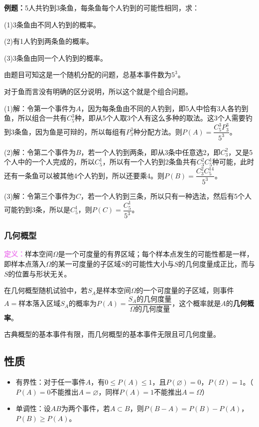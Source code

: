 \textbf{例题：}5人共钓到3条鱼，每条鱼每个人钓到的可能性相同，求：

(1)3条鱼由不同人钓到的概率。

(2)有1人钓到两条鱼的概率。

(3)3条鱼由同一个人钓到的概率。

由题目可知这是一个随机分配的问题，总基本事件数为$5^3$。

对于鱼而言没有明确的区分说明，所以这个就是个组合问题。

(1)解：令第一个事件为$A$，因为每条鱼由不同的人钓到，即5人中恰有3人各钓到鱼，所以组合一共有$C_5^3$种，即从5个人取3个人有这么多种的取法。这3个人需要钓到3条鱼，因为鱼是可辩的，所以每组有$P_3^3$种分配方法。则$P(A)=\dfrac{C_5^3P_3^3}{5^3}$。

(2)解：令第二个事件为$B$，若一个人钓到两条，即从3条中任意选2，即$C_3^2$，又是5个人中的一个人完成的，所以$C_5^1$，所以有一个人钓到2条鱼共有$C_3^2C_5^1$种可能，此时还有一条鱼可以被其他4个人钓到，所以还要乘4。则$P(B)=\dfrac{C_3^2C_5^14}{5^3}$。

(3)解：令第三个事件为$C$，若一个人钓到三条，所以只有一种选法，然后有5个人可能钓到3条，所以是$C_5^1$，则$P(C)=\dfrac{C_5^1}{5^3}$。

\subsubsection{几何概型}

\textcolor{violet}{\textbf{定义：}}样本空间$\Omega$是一个可度量的有界区域；每个样本点发生的可能性都是一样，即样本点落入$\Omega$的某一可度量的子区域$S$的可能性大小与$S$的几何度量成正比，而与$S$的位置与形状无关。

在几何概型随机试验中，若$S_A$是样本空间$\Omega$的一个可度量的子区域，则事件$A={\text{样本落入区域}S_A}$的概率为$P(A)=\dfrac{S_A\text{的几何度量}}{\Omega\text{的几何度量}}$，这个概率就是$A$的\textbf{几何概率}。

古典概型的基本事件有限，而几何概型的基本事件无限且可几何度量。

\subsection{性质}

\begin{itemize}
    \item 有界性：对于任一事件$A$，有$0\leqslant P(A)\leqslant1$，且$P(\varnothing)=0$，$P(\Omega)=1$。（$P(A)=0$不能推出$A=\varnothing$，同样$P(A)=1$不能推出$A=\Omega$）
    \item 单调性：设$AB$为两个事件，若$A\subset B$，则$P(B-A)=P(B)-P(A)$，$P(B)\geqslant P(A)$。
\end{itemize}

